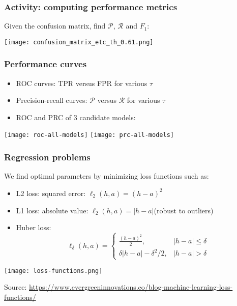 \documentclass[smaller]{beamer}
\newcommand{\?}{\stackrel{?}{=}}
\newcommand{\fr}{\frac}
\newcommand{\mc}{\mathcal}
\begin{document}
    \begin{frame}
      \frametitle{Activity: computing performance metrics}

      Given the confusion matrix, find $\mc{P}$, $\mc{R}$ and $F_{1}$:

      \pause
      \begin{center} \texttt{[image: confusion\_matrix\_etc\_th\_0.61.png]}
      \end{center}
      
    \end{frame}
    
\begin{frame}
  \frametitle{Performance curves}
  \pause
  \begin{itemize}
  \item ROC curves: TPR versus FPR for various $\tau$

    \pause

  \item Precision-recall curves: $\mc{P}$ versus $\mc{R}$ for various $\tau$

    \pause
   
  \item ROC and PRC of 3 candidate models:
  \end{itemize}

  \pause

  \begin{center}
    \texttt{[image: roc-all-models]}
    \texttt{[image: prc-all-models]}
  \end{center}
\end{frame}


\begin{frame}
  \frametitle{Regression problems}
  \pause
  We find optimal parameters by minimizing loss functions such as:\pause
  \begin{itemize}
  \item L2 loss: squared error: $\ell_{2}(h,a) = (h-a)^{2}$\pause
  \item L1 loss: absolute value: $\ell_{2}(h,a) = |h-a|$\pause (robust to outliers)\pause
  \item Huber loss:
    \begin{equation}
      \ell_{\delta}(h,a) =
      \begin{cases}
        \fr{(h-a)^{2}}{2},          & |h-a|\le \delta \\
        \delta|h-a| - \delta^{2}/2, & |h-a| > \delta 
      \end{cases}
    \end{equation}
  \end{itemize}
  \pause

  \begin{center}
    \texttt{[image: loss-functions.png]}

    {\scriptsize Source: \url{https://www.evergreeninnovations.co/blog-machine-learning-loss-functions/}}
  \end{center}
  
\end{frame}
\end{document}
